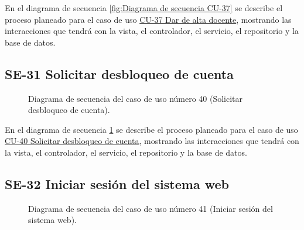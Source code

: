En el diagrama de secuencia \ref{fig:Diagrama de secuencia CU-37} se describe el proceso planeado para el caso de uso \hyperlink{CU-37}{CU-37 Dar de alta docente}, mostrando las interacciones que tendrá con la vista, el controlador, el servicio, el repositorio y la base de datos.

\newpage

\subsection{SE-31 Solicitar desbloqueo de cuenta}

\begin{figure}[htbp!]
	\begin{center}
		\caption{Diagrama de secuencia del caso de uso número 40 (Solicitar desbloqueo de cuenta).}
		\label{fig:Diagrama de secuencia CU-40}
	\end{center}
\end{figure}

En el diagrama de secuencia \ref{fig:Diagrama de secuencia CU-40} se describe el proceso planeado para el caso de uso \hyperlink{CU-40}{CU-40 Solicitar desbloqueo de cuenta}, mostrando las interacciones que tendrá con la vista, el controlador, el servicio, el repositorio y la base de datos.

\newpage

\subsection{SE-32 Iniciar sesión del sistema web}

\begin{figure}[htbp!]
	\begin{center}
		\caption{Diagrama de secuencia del caso de uso número 41 (Iniciar sesión del sistema web).}
		\label{fig:Diagrama de secuencia CU-41}
	\end{center}
\end{figure}


